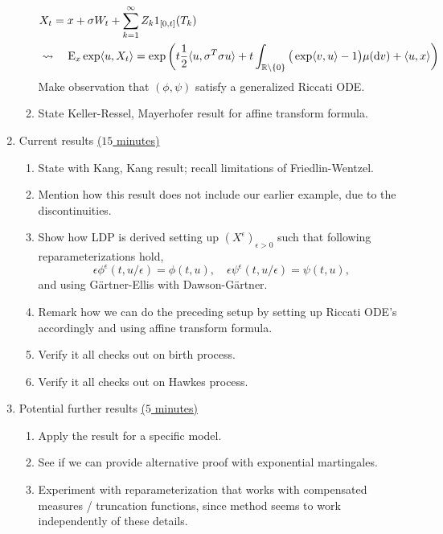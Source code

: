\documentclass{article}
\newcommand{\bbR}{\mathbb{R}}
\newcommand{\rmE}{\mathrm{E}}
\begin{document}
\begin{enumerate}
\begin{enumerate}
        \begin{align*}
          & X_t = x + \sigma W_t + \sum_{k=1}^\infty Z_k 1_{[0, t]}(T_k) \\
          &\leadsto \quad \rmE_x\exp\langle u, X_t \rangle = \exp\bigg( t\frac12\langle u, \sigma^T \sigma u \rangle + t\int_{\bbR \setminus\{0\}} \big(\exp\langle v, u \rangle - 1\big) \mu({\rm d}v) + \langle u, x \rangle\bigg)
        \end{align*}
        Make observation that $(\phi, \psi)$ satisfy a generalized Riccati ODE.
      \item
        State Keller-Ressel, Mayerhofer result for affine transform formula.
    \end{enumerate}
  \item
    Current results \underline{($15$ minutes)}
    \begin{enumerate}
      \item
        State with Kang, Kang result; recall limitations of Friedlin-Wentzel.
      \item
        Mention how this result does not include our earlier example, due to the discontinuities.
      \item
        Show how LDP is derived setting up $(X^\epsilon)_{\epsilon > 0}$ such that following reparameterizations hold,
        \[
          \epsilon\phi^\epsilon(t, u/\epsilon) = \phi(t, u), \quad \epsilon\psi^\epsilon(t, u/\epsilon) = \psi(t, u),
        \]
        and using G\"artner-Ellis with Dawson-G\"artner.
      \item
        Remark how we can do the preceding setup by setting up Riccati ODE's accordingly and using affine transform formula.
      \item
        Verify it all checks out on birth process.
      \item
        Verify it all checks out on Hawkes process.
    \end{enumerate}
  \item
    Potential further results \underline{($5$ minutes)}
    \begin{enumerate}
      \item
        Apply the result for a specific model.
      \item
        See if we can provide alternative proof with exponential martingales.
      \item
        Experiment with reparameterization that works with compensated measures / truncation functions, since method seems to work independently of these details.
    \end{enumerate}
\end{enumerate}
\end{document}

